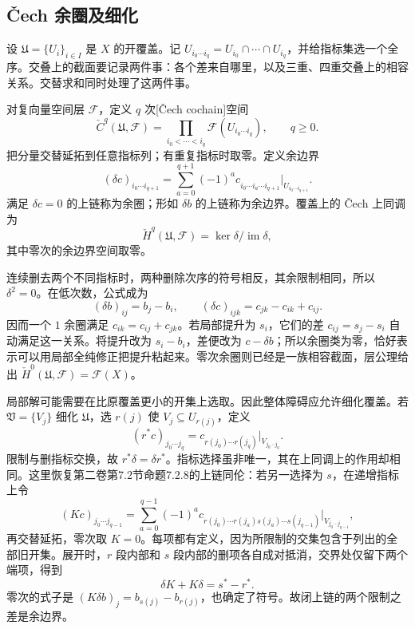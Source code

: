\subsection{Čech 余圈及细化}
\label{g4:subsec:0302:02}

设 \(\mathfrak U=\{U_i\}_{i\in I}\) 是 \(X\) 的开覆盖。记 \(U_{i_0\cdots i_q}=U_{i_0}\cap\cdots\cap U_{i_q}\)，并给指标集选一个全序。交叠上的截面要记录两件事：各个差来自哪里，以及三重、四重交叠上的相容关系。交替求和同时处理了这两件事。

\begin{definition}
\label{g4:def:0302:cech}
对复向量空间层 \(\mathcal F\)，定义 \(q\) 次[Čech cochain]空间
\[
 \check C^q(\mathfrak U,\mathcal F)
 =\prod_{i_0<\cdots<i_q}\mathcal F(U_{i_0\cdots i_q}),\qquad q\geq0.
\]
把分量交替延拓到任意指标列；有重复指标时取零。定义余边界
\begin{equation}
\label{g4:eq:0302:cech-differential}
 (\delta c)_{i_0\cdots i_{q+1}}
 =\sum_{a=0}^{q+1}(-1)^a
 c_{i_0\cdots\widehat{i_a}\cdots i_{q+1}}\big|_{U_{i_0\cdots i_{q+1}}}.
\end{equation}
满足 \(\delta c=0\) 的上链称为余圈；形如 \(\delta b\) 的上链称为余边界。覆盖上的 Čech 上同调为
\[
 \check H^q(\mathfrak U,\mathcal F)
 =\ker\delta\big/\operatorname{im}\delta,
\]
其中零次的余边界空间取零。
\end{definition}

连续删去两个不同指标时，两种删除次序的符号相反，其余限制相同，所以 \(\delta^2=0\)。在低次数，公式成为
\[
 (\delta b)_{ij}=b_j-b_i,\qquad
 (\delta c)_{ijk}=c_{jk}-c_{ik}+c_{ij}.
\]
因而一个 \(1\) 余圈满足 \(c_{ik}=c_{ij}+c_{jk}\)。若局部提升为 \(s_i\)，它们的差 \(c_{ij}=s_j-s_i\) 自动满足这一关系。将提升改为 \(s_i-b_i\)，差便改为 \(c-\delta b\)；所以余圈类为零，恰好表示可以用局部全纯修正把提升粘起来。零次余圈则已经是一族相容截面，层公理给出 \(\check H^0(\mathfrak U,\mathcal F)=\mathcal F(X)\)。

\ProseParagraphBreak

局部解可能需要在比原覆盖更小的开集上选取。因此整体障碍应允许细化覆盖。若 \(\mathfrak V=\{V_j\}\) 细化 \(\mathfrak U\)，选 \(r(j)\) 使 \(V_j\subseteq U_{r(j)}\)，定义
\[
 (r^*c)_{j_0\cdots j_q}
 =c_{r(j_0)\cdots r(j_q)}|_{V_{j_0\cdots j_q}}.
\]
限制与删指标交换，故 \(r^*\delta=\delta r^*\)。指标选择虽非唯一，其在上同调上的作用却相同。这里恢复第二卷第7.2节命题7.2.8的上链同伦：若另一选择为 \(s\)，在递增指标上令
\[
 (Kc)_{j_0\cdots j_{q-1}}
 =\sum_{a=0}^{q-1}(-1)^a
 c_{r(j_0)\cdots r(j_a)s(j_a)\cdots s(j_{q-1})}\big|_{V_{j_0\cdots j_{q-1}}},
\]
再交替延拓，零次取 \(K=0\)。每项都有定义，因为所限制的交集包含于列出的全部旧开集。展开时，\(r\) 段内部和 \(s\) 段内部的删项各自成对抵消，交界处仅留下两个端项，得到
\[
 \delta K+K\delta=s^*-r^*.
\]
零次的式子是 \((K\delta b)_j=b_{s(j)}-b_{r(j)}\)，也确定了符号。故闭上链的两个限制之差是余边界。

